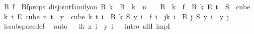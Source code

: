 \begin{isabellebody}
\ B\ f\ \ Bf{\isacharunderscore}{\kern0pt}props{\isacharcolon}{\kern0pt}\ {\isachardoublequoteopen}disjoint{\isacharunderscore}{\kern0pt}family{\isacharunderscore}{\kern0pt}on\ B\ {\isacharbraceleft}{\kern0pt}{\isachardot}{\kern0pt}{\isachardot}{\kern0pt}k{\isacharbraceright}{\kern0pt}\ {\isasymand}\ {\isasymUnion}{\isacharparenleft}{\kern0pt}B\ {\isacharbackquote}{\kern0pt}\ {\isacharbraceleft}{\kern0pt}{\isachardot}{\kern0pt}{\isachardot}{\kern0pt}k{\isacharbraceright}{\kern0pt}{\isacharparenright}{\kern0pt}\ {\isacharequal}{\kern0pt}\ {\isacharbraceleft}{\kern0pt}{\isachardot}{\kern0pt}{\isachardot}{\kern0pt}{\isacharless}{\kern0pt}n{\isacharbraceright}{\kern0pt}\ {\isasymand}\ {\isacharparenleft}{\kern0pt}{\isacharbraceleft}{\kern0pt}{\isacharbraceright}{\kern0pt}\ {\isasymnotin}\ B\ {\isacharbackquote}{\kern0pt}\ {\isacharbraceleft}{\kern0pt}{\isachardot}{\kern0pt}{\isachardot}{\kern0pt}{\isacharless}{\kern0pt}k{\isacharbraceright}{\kern0pt}{\isacharparenright}{\kern0pt}\ {\isasymand}\ f\ {\isasymin}\ {\isacharparenleft}{\kern0pt}B\ k{\isacharparenright}{\kern0pt}\ {\isasymrightarrow}\isactrlsub E\ {\isacharbraceleft}{\kern0pt}{\isachardot}{\kern0pt}{\isachardot}{\kern0pt}{\isacharless}{\kern0pt}t{\isacharbraceright}{\kern0pt}\ {\isasymand}\ S\ {\isasymin}\ {\isacharparenleft}{\kern0pt}cube\ k\ t{\isacharparenright}{\kern0pt}\ {\isasymrightarrow}\isactrlsub E\ {\isacharparenleft}{\kern0pt}cube\ n\ t{\isacharparenright}{\kern0pt}\ {\isasymand}\ {\isacharparenleft}{\kern0pt}{\isasymforall}y\ {\isasymin}\ cube\ k\ t{\isachardot}{\kern0pt}\ {\isacharparenleft}{\kern0pt}{\isasymforall}i\ {\isasymin}\ B\ k{\isachardot}{\kern0pt}\ S\ y\ i\ {\isacharequal}{\kern0pt}\ f\ i{\isacharparenright}{\kern0pt}\ {\isasymand}\ {\isacharparenleft}{\kern0pt}{\isasymforall}j{\isacharless}{\kern0pt}k{\isachardot}{\kern0pt}\ {\isasymforall}i\ {\isasymin}\ B\ j{\isachardot}{\kern0pt}\ {\isacharparenleft}{\kern0pt}S\ y{\isacharparenright}{\kern0pt}\ i\ {\isacharequal}{\kern0pt}\ y\ j{\isacharparenright}{\kern0pt}{\isacharparenright}{\kern0pt}{\isachardoublequoteclose}\ \isamarkupfalse%
\ is{\isacharunderscore}{\kern0pt}subspace{\isacharunderscore}{\kern0pt}def\ \isamarkupfalse%
\ auto\isanewline
\ \isamarkupfalse%
\ {\isachardoublequoteopen}{\isasymforall}i{\isacharless}{\kern0pt}k{\isachardot}{\kern0pt}\ x\ i\ {\isacharequal}{\kern0pt}\ y\ i{\isachardoublequoteclose}\isanewline
\ \isamarkupfalse%
\ {\isacharparenleft}{\kern0pt}intro\ allI\ impI{\isacharparenright}{\kern0pt}\isanewline

\end{isabellebody}
